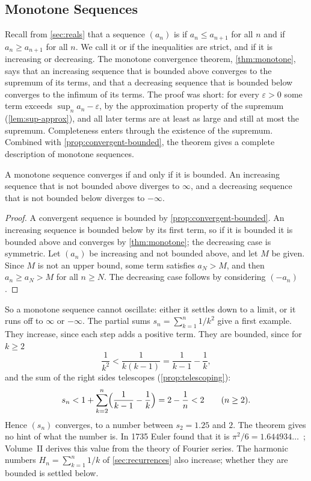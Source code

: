 \subsection{Monotone Sequences}

Recall from \cref{sec:reals} that a sequence $(a_n)$ is  if $a_n\le a_{n+1}$ for all $n$ and  if $a_n\ge a_{n+1}$ for all $n$. We call it  or  if the inequalities are strict, and  if it is increasing or decreasing. The monotone convergence theorem, \cref{thm:monotone}, says that an increasing sequence that is bounded above converges to the supremum of its terms, and that a decreasing sequence that is bounded below converges to the infimum of its terms. The proof was short: for every $\varepsilon>0$ some term exceeds $\sup_na_n-\varepsilon$, by the approximation property of the supremum (\cref{lem:sup-approx}), and all later terms are at least as large and still at most the supremum. Completeness enters through the existence of the supremum. Combined with \cref{prop:convergent-bounded}, the theorem gives a complete description of monotone sequences.

\begin{corollary}
\label{cor:monotone-dichotomy}
A monotone sequence converges if and only if it is bounded. An increasing sequence that is not bounded above diverges to $\infty$, and a decreasing sequence that is not bounded below diverges to $-\infty$.
\end{corollary}

\begin{proof}
A convergent sequence is bounded by \cref{prop:convergent-bounded}. An increasing sequence is bounded below by its first term, so if it is bounded it is bounded above and converges by \cref{thm:monotone}; the decreasing case is symmetric. Let $(a_n)$ be increasing and not bounded above, and let $M$ be given. Since $M$ is not an upper bound, some term satisfies $a_N>M$, and then $a_n\ge a_N>M$ for all $n\ge N$. The decreasing case follows by considering $(-a_n)$.
\end{proof}

So a monotone sequence cannot oscillate: either it settles down to a limit, or it runs off to $\infty$ or $-\infty$. The partial sums $s_n=\sum_{k=1}^n1/k^2$ give a first example. They increase, since each step adds a positive term. They are bounded, since for $k\ge2$
\[
\frac1{k^2}<\frac1{k(k-1)}=\frac1{k-1}-\frac1k ,
\]
and the sum of the right sides telescopes (\cref{prop:telescoping}):
\[
s_n<1+\sum_{k=2}^n\Bigl(\frac1{k-1}-\frac1k\Bigr)=2-\frac1n<2\qquad(n\ge2).
\]
Hence $(s_n)$ converges, to a number between $s_2=1.25$ and $2$. The theorem gives no hint of what the number is. In 1735 Euler found that it is $\pi^2/6=1.644934\ldots$~\cite{hairer1996analysis}; Volume~II derives this value from the theory of Fourier series. The harmonic numbers $H_n=\sum_{k=1}^n1/k$ of \cref{sec:recurrences} also increase; whether they are bounded is settled below.


